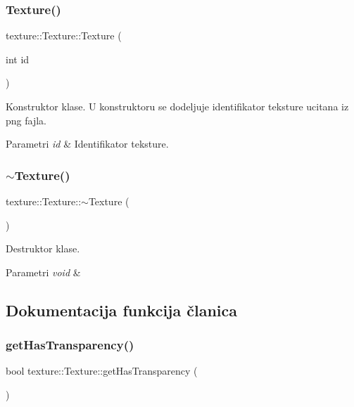 \subsubsection{\texorpdfstring{Texture()}{Texture()}}
{\footnotesize\ttfamily texture\+::\+Texture\+::\+Texture (\begin{DoxyParamCaption}\item[{int}]{id }\end{DoxyParamCaption})}



Konstruktor klase. U konstruktoru se dodeljuje identifikator teksture ucitana iz png fajla. 


\begin{DoxyParams}{Parametri}
{\em id} & Identifikator teksture. \\
\hline
\end{DoxyParams}
\mbox{\label{classtexture_1_1Texture_a78ee86dc34523d645ea009de0b01ed45}} 
\subsubsection{\texorpdfstring{$\sim$\+Texture()}{~Texture()}}
{\footnotesize\ttfamily texture\+::\+Texture\+::$\sim$\+Texture (\begin{DoxyParamCaption}{ }\end{DoxyParamCaption})}



Destruktor klase. 


\begin{DoxyParams}{Parametri}
{\em void} & \\
\hline
\end{DoxyParams}


\subsection{Dokumentacija funkcija članica}
\mbox{\label{classtexture_1_1Texture_af200f2548ab2379026b6b234d53e6e18}} 
\subsubsection{\texorpdfstring{get\+Has\+Transparency()}{getHasTransparency()}}
{\footnotesize\ttfamily bool texture\+::\+Texture\+::get\+Has\+Transparency (\begin{DoxyParamCaption}{ }\end{DoxyParamCaption})}



